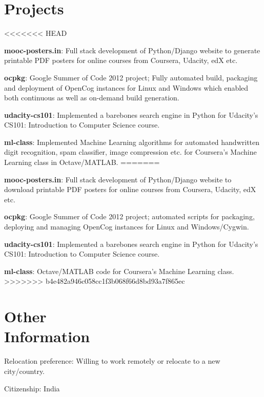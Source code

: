 \documentclass[margin,line]{resume}
\begin{document}
\begin{resume}
    \section{\mysidestyle Projects} 
	\begin{list2}
<<<<<<< HEAD
	\item \textbf{mooc-posters.in}: Full stack development of Python/Django website to generate printable PDF posters for online courses from Coursera, Udacity, edX etc.
	\item \textbf{ocpkg}: Google Summer of Code 2012 project; Fully automated build, packaging and deployment of OpenCog instances for Linux and Windows which enabled both continuous as well as on-demand build generation.
	\item \textbf{udacity-cs101}: Implemented a barebones search engine in Python for Udacity's CS101: Introduction to Computer Science course.
	\item \textbf{ml-class}: Implemented Machine Learning algorithms for automated handwritten digit recognition, spam classifier, image compression etc. for Coursera's Machine Learning class in Octave/MATLAB.
=======
	\item \textbf{mooc-posters.in}: Full stack development of Python/Django website to download printable PDF posters for online courses from Coursera, Udacity, edX etc.
	\item \textbf{ocpkg}: Google Summer of Code 2012 project; automated scripts for packaging, deploying and managing OpenCog instances for Linux and Windows/Cygwin.
	\item \textbf{udacity-cs101}: Implemented a barebones search engine in Python for Udacity's CS101: Introduction to Computer Science course.
	\item \textbf{ml-class}: Octave/MATLAB code for Coursera's Machine Learning class.
>>>>>>> b4e482a946c058cc1f3b068f66d8bd93a7f865ec
    \end{list2}

    \section{\mysidestyle Other \\ Information}
    \begin{list2}
    \item Relocation preference: Willing to work remotely or relocate to a new city/country.
    \item Citizenship: India
    \end{list2}


\end{resume}
\end{document}
